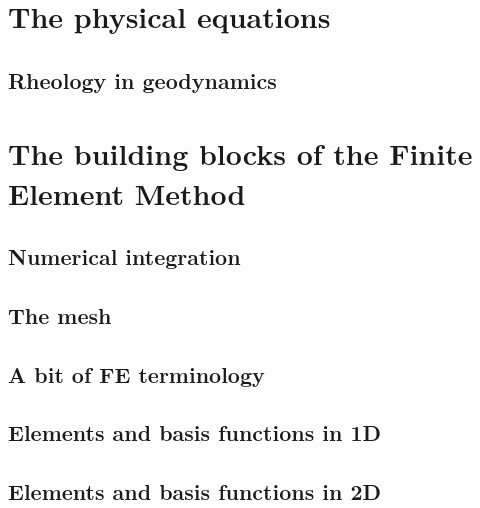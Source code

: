 \documentclass[a4paper]{article}
\begin{document}

\newpage
\section{The physical equations} %
\subsection{Rheology in geodynamics}  %

\newpage
\section{The building blocks of the Finite Element Method} %
\subsection{Numerical integration} \label{sec:quadrature} %
\subsection{The mesh}
\subsection{A bit of FE terminology}  %
\subsection{Elements and basis functions in 1D}\label{sec:elts1D}  %
\subsection{Elements and basis functions in 2D}\label{sec:shpfct2d}  %
\end{document}
